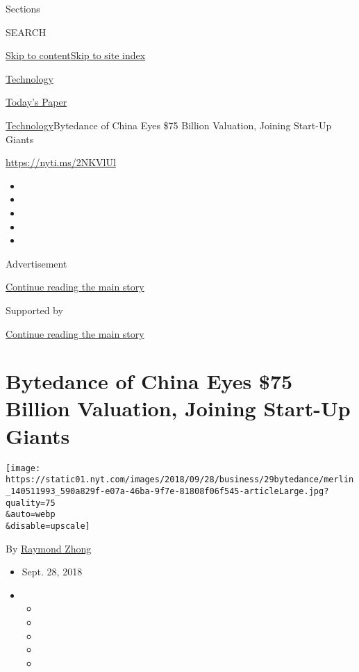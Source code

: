 Sections

SEARCH

\protect\hyperlink{site-content}{Skip to
content}\protect\hyperlink{site-index}{Skip to site index}

\href{https://www.nytimes.com/section/technology}{Technology}

\href{https://myaccount.nytimes.com/auth/login?response_type=cookie\&client_id=vi}{}

\href{https://www.nytimes.com/section/todayspaper}{Today's Paper}

\href{/section/technology}{Technology}\textbar{}Bytedance of China Eyes
\$75 Billion Valuation, Joining Start-Up Giants

\url{https://nyti.ms/2NKVlUl}

\begin{itemize}
\item
\item
\item
\item
\item
\end{itemize}

Advertisement

\protect\hyperlink{after-top}{Continue reading the main story}

Supported by

\protect\hyperlink{after-sponsor}{Continue reading the main story}

\hypertarget{bytedance-of-china-eyes-75-billion-valuation-joining-start-up-giants}{%
\section{Bytedance of China Eyes \$75 Billion Valuation, Joining
Start-Up
Giants}\label{bytedance-of-china-eyes-75-billion-valuation-joining-start-up-giants}}

\texttt{[image: https://static01.nyt.com/images/2018/09/28/business/29bytedance/merlin\_140511993\_590a829f-e07a-46ba-9f7e-81808f06f545-articleLarge.jpg?quality=75\\\&auto=webp\\\&disable=upscale]}

By \href{https://www.nytimes.com/by/raymond-zhong}{Raymond Zhong}

\begin{itemize}
\item
  Sept. 28, 2018
\item
  \begin{itemize}
  \item
  \item
  \item
  \item
  \item
  \end{itemize}
\end{itemize}

